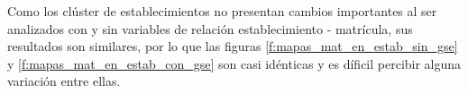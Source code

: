Como los clúster de establecimientos no presentan cambios importantes al ser analizados con y sin variables de relación establecimiento - matrícula, sus resultados son similares, por lo que las figuras \ref{f:mapas_mat_en_estab_sin_gse} y \ref{f:mapas_mat_en_estab_con_gse} son casi idénticas y es díficil percibir alguna variación entre ellas.

\begin{figure}[H]
 \centering
  \hspace{1mm}

\end{figure}
